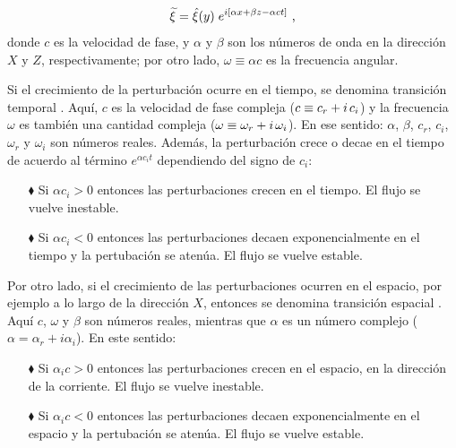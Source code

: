 \begin{equation}
\widetilde{\xi} = \hat{\xi}(y) \hspace{1mm} e^{i \left[ \alpha x + \beta z - \alpha c t \right]} \text{ ,}
\label{eq:waves3d}
\end{equation}
donde $c$  es la velocidad de fase, y $\alpha$ y $\beta$ son los números de onda en la dirección $X$ y $Z$, respectivamente; por otro lado, $\omega \equiv \alpha c$ es la frecuencia angular. 

Si el crecimiento de la perturbación ocurre en el tiempo, se denomina transición temporal \cite{machaca2024}. Aquí, $c$ es la velocidad de fase compleja ($c \equiv c_r + i \hspace{0.5mm} c_i$) y la frecuencia $\omega$ es también una cantidad compleja ($\omega \equiv \omega_r + i \hspace{0.5mm} \omega_i$). En ese sentido: $\alpha$, $\beta$, $c_r$, $c_i$, $\omega_r$ y $\omega_i$ son números reales. Además, la perturbación crece o decae en el tiempo de acuerdo al término $e^{\alpha c_i t}$ dependiendo del signo de $c_i$: 

\begin{itemize}
\item[$\blacklozenge$] Si $\alpha c_i > 0$ entonces las perturbaciones crecen en el tiempo. El flujo se vuelve inestable.

\item[$\blacklozenge$] Si $\alpha c_i < 0$ entonces las perturbaciones decaen exponencialmente en el tiempo y la pertubación se atenúa. El flujo se vuelve estable.
\end{itemize}

Por otro lado, si el crecimiento de las perturbaciones ocurren en el espacio, por ejemplo a lo largo de la dirección $X$, entonces se denomina transición espacial \cite{machaca2024}. Aquí $c$, $\omega$ y $\beta$ son números reales, mientras que $\alpha$ es un número complejo ($\alpha = \alpha_r + i \alpha_i$). En este sentido:

\begin{itemize}
\item[$\blacklozenge$] Si $\alpha_i c > 0$ entonces las perturbaciones crecen en el espacio, en la dirección de la corriente. El flujo se vuelve inestable.

\item[$\blacklozenge$] Si $\alpha_i c < 0$ entonces las perturbaciones decaen exponencialmente en el espacio y la pertubación se atenúa. El flujo se vuelve estable.
\end{itemize}

